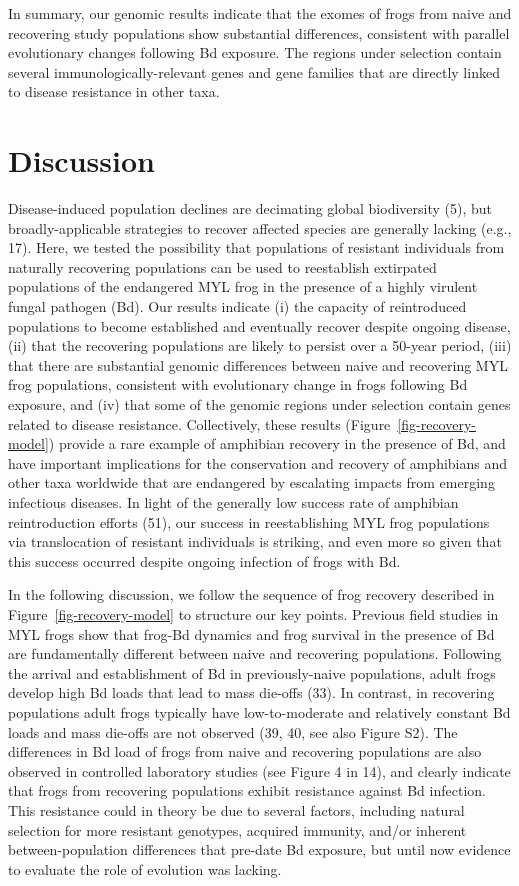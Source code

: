 \documentclass[9pt,twocolumn,twoside,lineno]{pnas-new}
\begin{document}
In summary, our genomic results indicate that the exomes of frogs from
naive and recovering study populations show substantial differences,
consistent with parallel evolutionary changes following Bd exposure. The
regions under selection contain several immunologically-relevant genes
and gene families that are directly linked to disease resistance in
other taxa.

\section*{Discussion}

Disease-induced population declines are decimating global biodiversity
(5), but broadly-applicable strategies to recover affected species are
generally lacking (e.g., 17). Here, we tested the possibility that
populations of resistant individuals from naturally recovering
populations can be used to reestablish extirpated populations of the
endangered MYL frog in the presence of a highly virulent fungal pathogen
(Bd). Our results indicate (i) the capacity of reintroduced populations
to become established and eventually recover despite ongoing disease,
(ii) that the recovering populations are likely to persist over a
50-year period, (iii) that there are substantial genomic differences
between naive and recovering MYL frog populations, consistent with
evolutionary change in frogs following Bd exposure, and (iv) that some
of the genomic regions under selection contain genes related to disease
resistance. Collectively, these results
(Figure~\ref{fig-recovery-model}) provide a rare example of amphibian
recovery in the presence of Bd, and have important implications for the
conservation and recovery of amphibians and other taxa worldwide that
are endangered by escalating impacts from emerging infectious diseases.
In light of the generally low success rate of amphibian reintroduction
efforts (51), our success in reestablishing MYL frog populations via
translocation of resistant individuals is striking, and even more so
given that this success occurred despite ongoing infection of frogs with
Bd.

In the following discussion, we follow the sequence of frog recovery
described in Figure~\ref{fig-recovery-model} to structure our key
points. Previous field studies in MYL frogs show that frog-Bd dynamics
and frog survival in the presence of Bd are fundamentally different
between naive and recovering populations. Following the arrival and
establishment of Bd in previously-naive populations, adult frogs develop
high Bd loads that lead to mass die-offs (33). In contrast, in
recovering populations adult frogs typically have low-to-moderate and
relatively constant Bd loads and mass die-offs are not observed (39, 40,
see also Figure S2). The differences in Bd
load of frogs from naive and recovering populations are also observed in
controlled laboratory studies (see Figure 4 in 14), and clearly indicate
that frogs from recovering populations exhibit resistance against Bd
infection. This resistance could in theory be due to several factors,
including natural selection for more resistant genotypes, acquired
immunity, and/or inherent between-population differences that pre-date
Bd exposure, but until now evidence to evaluate the role of evolution
was lacking.
\end{document}

